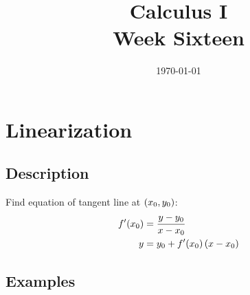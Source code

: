 \documentclass[letterpaper, landscape]{exam}
\author{}
\date{\today}
\title{Calculus I \\ Week Sixteen}
\begin{document}
  \maketitle
  \tableofcontents

  \section{Linearization} %
  
  \subsection{Description} %
  
  Find equation of tangent line at $\del{x_0, y_0}$:
  \begin{align*}
    f'(x_0) & = \frac{y - y_0}{x - x_0} \\
    y       & = y_0 + f'(x_0) \del{x - x_0} \\
  \end{align*}

  \subsection{Examples} %
  
\end{document}
